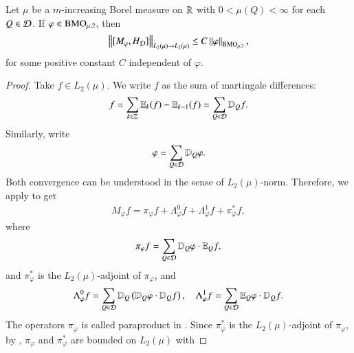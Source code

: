 \documentclass[leqno]{amsart}
\begin{document}

\begin{proposition}\label{L2 estimate}
Let $\mu$ be a $m$-increasing Borel measure on ${\mathbb R}$ with $0<\mu(Q)<\infty$ for each $Q\in{\mathcal D}$.  If $\varphi\in{\rm BMO}_{\mu,2}$, then 
\begin{align*}
\left\| [M_{\varphi},H_{{\mathcal D}}] \right\|_{L_{2}(\mu)\rightarrow L_{2}(\mu)}
\leq C\left\| \varphi \right\|_{{\rm BMO}_{\mu,2}},
\end{align*}
for some positive constant $C$ independent of $\varphi$.
\end{proposition}
\begin{proof}
Take $f\in L_2(\mu)$. We write $f$ as the sum of martingale differences:
$$f=\sum_{k\in\mathbb{Z}}\mathbb{E}_k(f)-\mathbb{E}_{k-1}(f)=\sum_{Q\in{\mathcal D}}\mathbb{D}_{Q}f.$$
Similarly, write
 $$\displaystyle\varphi=\sum_{Q\in{\mathcal D}}\mathbb{D}_{Q}\varphi.$$
Both convergence can be understood in the sense of $L_{2}(\mu)$-norm.
Therefore, we apply \cite[Proposition 1.5]{Tr2013} to get
\begin{align*}
M_{\varphi}f=\pi_{\varphi}f+\Lambda^{0}_{\varphi}f+\Lambda^{1}_{\varphi}f+\pi_{\varphi}^{*}f,
\end{align*}
where
\begin{align*}
\pi_{\varphi}f
=\sum_{Q\in{\mathcal D}}\mathbb{D}_{Q}\varphi\cdot \mathbb E_{Q}f,
\end{align*}
and $\pi_{\varphi}^{*}$ is the $L_{2}(\mu)$-adjoint of $\pi_{\varphi}$, and
\begin{align*}
\Lambda^{0}_{\varphi}f
=\sum_{Q\in{\mathcal D}}\mathbb{D}_{Q}\left(\mathbb{D}_{Q}\varphi\cdot\mathbb{D}_{Q}f\right),\quad
\Lambda^{1}_{\varphi}f
=\sum_{Q\in{\mathcal D}}\mathbb E_{Q}\varphi\cdot\mathbb{D}_{Q}f.
\end{align*}
The operators $\pi_{\varphi}$ is called paraproduct in \cite{Tr2013}. 
Since $\pi_{\varphi}^{*}$ is the $L_{2}(\mu)$-adjoint of $\pi_{\varphi}$, by , $\pi_{\varphi}$ and $\pi_{\varphi}^{*}$ are bounded on $L_{2}(\mu)$ with

\end{proof}
\end{document}
